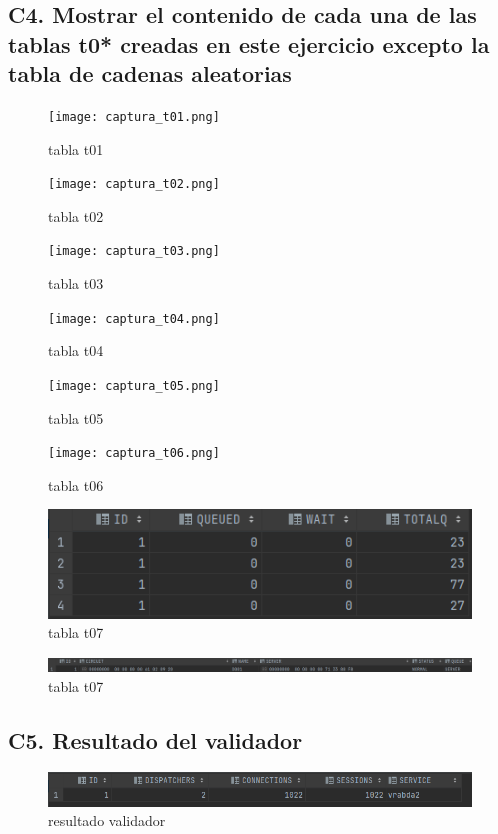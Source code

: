 \documentclass[journal]{IEEEtran}
\begin{document}
\subsection{C4. Mostrar el contenido de cada una de las tablas t0* creadas en este ejercicio excepto la tabla de cadenas aleatorias}
\begin{figure}[H]
  \centering
  \texttt{[image: captura\_t01.png]}
   \caption{tabla t01}
   \label{fig:validador_t01}
\end{figure}
\begin{figure}[H]
  \centering
  \texttt{[image: captura\_t02.png]}
   \caption{tabla t02}
   \label{fig:validador_t02}
\end{figure}
\begin{figure}[H]
  \centering
  \texttt{[image: captura\_t03.png]}
   \caption{tabla t03}
   \label{fig:validador_t03}
\end{figure}
\begin{figure}[H]
  \centering
  \texttt{[image: captura\_t04.png]}
   \caption{tabla t04}
   \label{fig:validador_t04}
\end{figure}
\begin{figure}[H]
  \centering
  \texttt{[image: captura\_t05.png]}
   \caption{tabla t05}
   \label{fig:validador_t05}
\end{figure}
\begin{figure}[H]
  \centering
  \texttt{[image: captura\_t06.png]}
   \caption{tabla t06}
   \label{fig:validador_t06}
\end{figure}
\begin{figure}[H]
  \centering
  \includegraphics[scale=.20]{captura_5.png}
   \caption{tabla t07}
   \label{fig:validador_t07}
\end{figure}
\begin{figure}[H]
  \centering
  \includegraphics[scale=.20]{captura_6.png}
   \caption{tabla t07}
   \label{fig:validador_t09}
\end{figure}
\subsection{C5. Resultado del validador}
\begin{figure}[H]
  \centering
  \includegraphics[scale=.20]{captura_2.png}
   \caption{resultado validador}
   \label{fig:validador_val}
\end{figure}
\end{document}
